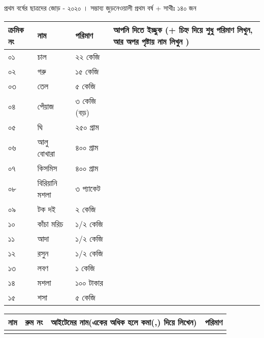 \documentclass[12pt]{article}
\newcommand{\aline}{\\\hline \arabic{theyflines} &&&\rule{0cm}{0.99cm}}
\begin{document}
\begin{center}
\end{center}
\noindent
\bgroup
\def\arraystretch{2.5}
\begin{center}প্রথম বর্ষের ছাত্রদের জোড় - ২০২০ । সম্ভাব্য জুড়নেওয়ালী প্রথম বর্ষ + সাথীঃ ১৪০ জন\end{center}
\begin{tabular}{@{}lll|p{15cm}}
\toprule
ক্রমিক নং &  নাম &  পরিমাণ & আপনি দিতে ইচ্ছুক (+ চিহ্ন দিয়ে শুধু পরিমাণ লিখুন, আর অপর পৃষ্টায় নাম লিখুন )\\
\toprule
০১ & চাল & ২২ কেজি &\\
\hline
০২ & গরু & ১৫ কেজি &\\
\hline
০৩ & তেল & ৫ কেজি &\\
\hline
০৪ & পেঁয়াজ & ৩ কেজি (বড়) &\\
\hline
০৫ & ঘি & ২৫০ গ্রাম &\\
\hline
০৬ & আলু বোখারা & ৪০০ গ্রাম &\\
\hline
০৭ & কিসমিস & ৪০০ গ্রাম &\\
\hline
০৮ & বিরিয়ানি মশলা & ৩ প্যাকেট &\\
\hline
০৯ & টক দই & ২ কেজি &\\
\hline
১০ & কাঁচা মরিচ & ১/২ কেজি &\\
\hline
১১ & আদা & ১/২ কেজি &\\
\hline
১২ & রসুন & ১/২ কেজি &\\
\hline
১৩ & লবণ & ১ কেজি &\\
\hline
১৪ & মশলা & ১০০ টাকার &\\
\hline
১৫ & শসা & ৫ কেজি &\\
\bottomrule
\end{tabular}
\egroup
\newpage
\noindent
\begin{tabular}{|p{5cm}|p{2cm}|p{7cm}|p{5cm}|}
\toprule
নাম & রুম নং & আইটেমের নাম(একের অধিক হলে কমা(,) দিয়ে লিখেন) & পরিমাণ
\forloop{theyflines}{1}{\value{theyflines} < 26}{\aline}\\
\toprule
\end{tabular}
\end{document}
